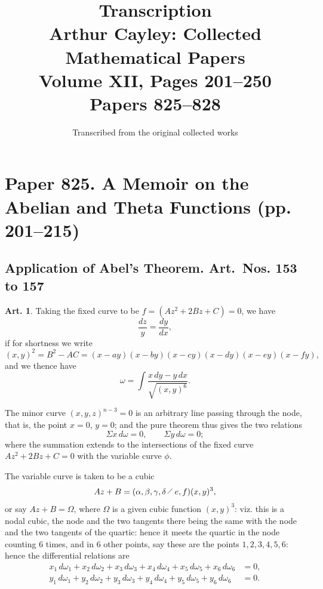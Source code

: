 \documentclass[11pt,a4paper]{article}
\title{\textbf{Transcription}\\[6pt]
\Large Arthur Cayley: Collected Mathematical Papers\\
Volume XII, Pages 201--250\\[12pt]
\large Papers 825--828}
\author{Transcribed from the original collected works}
\date{}
\theoremstyle{definition}
\newtheorem{art}{Art.}[section]
\begin{document}
\maketitle
\thispagestyle{empty}

\tableofcontents
\newpage

\section{Paper 825. A Memoir on the Abelian and Theta Functions (pp. 201--215)}


\subsection*{Application of Abel's Theorem. Art.~Nos. 153 to 157}

\begin{art}
Taking the fixed curve to be $f = (Az^2 + 2Bz + C) = 0$, we have
\[
\frac{dz}{y} = \frac{dy}{dx},
\]
if for shortness we write
\[
(x,y)^2 = B^2 - AC = (x-ay)(x-by)(x-cy)(x-dy)(x-ey)(x-fy),
\]
and we thence have
\[
\omega = \int \frac{x\,dy - y\,dx}{\sqrt{(x,y)^6}}.
\]

The minor curve $(x,y,z)^{n-3} = 0$ is an arbitrary line passing through the node, that is, the point $x=0$, $y=0$; and the pure theorem thus gives the two relations
\[
\Sigma x\,d\omega = 0, \qquad \Sigma y\,d\omega = 0;
\]
where the summation extends to the intersections of the fixed curve $Az^2 + 2Bz + C = 0$ with the variable curve $\phi$.

The variable curve is taken to be a cubic
\[
Az + B = (\alpha,\beta,\gamma,\delta\,\raisebox{0.5ex}{$\scriptstyle\diagup$}\,e,f)(x,y)^3,
\]
or say $Az + B = \Omega$, where $\Omega$ is a given cubic function $(x,y)^3$: viz. this is a nodal cubic, the node and the two tangents there being the same with the node and the two tangents of the quartic: hence it meets the quartic in the node counting 6 times, and in 6 other points, say these are the points $1,2,3,4,5,6$: hence the differential relations are
\begin{align*}
x_1\,d\omega_1 + x_2\,d\omega_2 + x_3\,d\omega_3 + x_4\,d\omega_4 + x_5\,d\omega_5 + x_6\,d\omega_6 &= 0, \\
y_1\,d\omega_1 + y_2\,d\omega_2 + y_3\,d\omega_3 + y_4\,d\omega_4 + y_5\,d\omega_5 + y_6\,d\omega_6 &= 0.
\end{align*}
\end{art}
\end{document}
